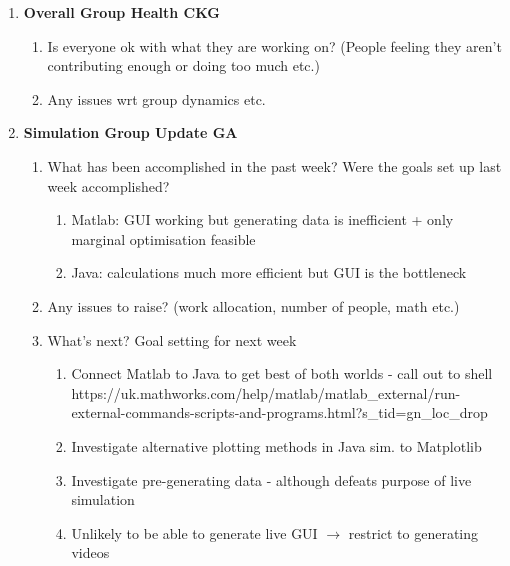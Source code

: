 \begin{enumerate}
\item  \textbf{Overall Group Health CKG}

\begin{enumerate}
\item Is everyone ok with what they are working on? (People feeling they aren't contributing enough or doing too much etc.)

\item  Any issues wrt group dynamics etc.

\end{enumerate}

\item  \textbf{Simulation Group Update GA}

\begin{enumerate}
\item What has been accomplished in the past week? Were the goals set up last week accomplished?

\begin{enumerate}
\item  Matlab: GUI working but generating data is inefficient + only marginal optimisation feasible

\item  Java: calculations much more efficient but GUI is the bottleneck
\end{enumerate}

\item  Any issues to raise? (work allocation, number of people,  math etc.)

\item  What's next? Goal setting for next week

\begin{enumerate}
\item  Connect Matlab to Java to get best of both worlds - call out to shell https://uk.mathworks.com/help/matlab/matlab\_external/run-external-commands-scripts-and-programs.html?s\_tid=gn\_loc\_drop

\item  Investigate alternative plotting methods in Java sim. to Matplotlib

\item  Investigate pre-generating data - although defeats purpose of live simulation

\item  Unlikely to be able to generate live GUI $\mathrm{\to}$ restrict to generating videos
\end{enumerate}


\end{enumerate}
\end{enumerate}
